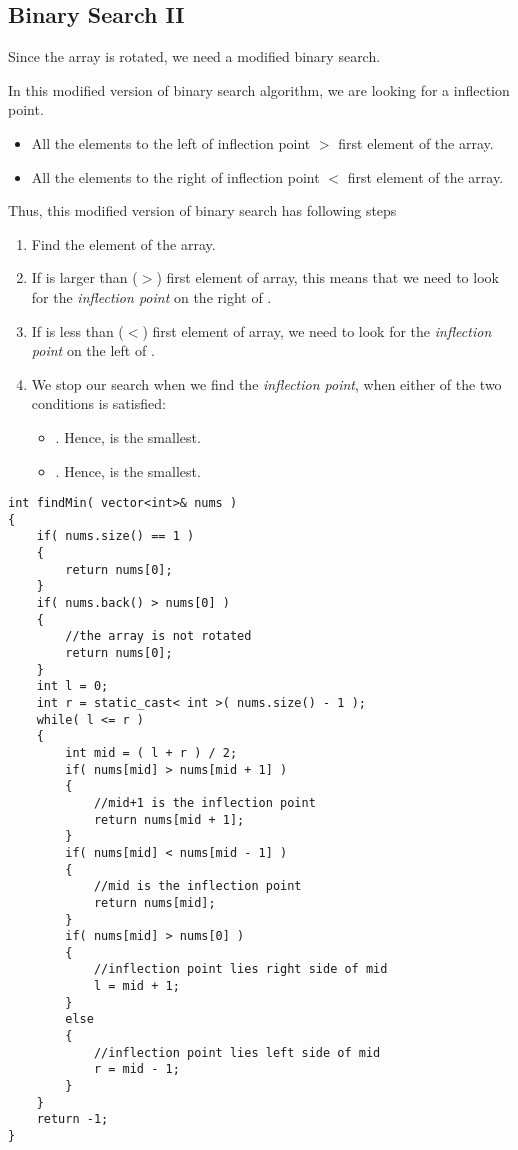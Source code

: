 \subsection{Binary Search II}
Since the array is rotated, we need a modified binary search. 

In this modified version of binary search algorithm, we are looking for a inflection point.

\begin{itemize}
\item All the elements to the left of inflection point $>$ first element of the array.
\item All the elements to the right of inflection point $<$ first element of the array.
\end{itemize}

Thus, this modified version of binary search has following steps

\begin{enumerate}
\item Find the  element of the array.
\item If  is larger than ($>$) first element of array, this means that we need to look for the \textit{inflection point} on the right of .
\item If  is less than ($<$) first element of array, we need to look for the \textit{inflection point} on the left of .
\item We stop our search when we find the \textit{inflection point}, when either of the two conditions is satisfied:

\begin{itemize}
\item {}. Hence,  is the smallest.
\item {}. Hence,  is the smallest.
\end{itemize}
\end{enumerate}

\begin{lstlisting}[style=customc, caption={Binary Search II}]
int findMin( vector<int>& nums )
{
    if( nums.size() == 1 )
    {
        return nums[0];
    }
    if( nums.back() > nums[0] )
    {
        //the array is not rotated
        return nums[0];
    }
    int l = 0;
    int r = static_cast< int >( nums.size() - 1 );
    while( l <= r )
    {
        int mid = ( l + r ) / 2;
        if( nums[mid] > nums[mid + 1] )
        {
            //mid+1 is the inflection point
            return nums[mid + 1];
        }
        if( nums[mid] < nums[mid - 1] )
        {
            //mid is the inflection point
            return nums[mid];
        }
        if( nums[mid] > nums[0] )
        {
            //inflection point lies right side of mid
            l = mid + 1;
        }
        else
        {
            //inflection point lies left side of mid
            r = mid - 1;
        }
    }
    return -1;
}
\end{lstlisting}
